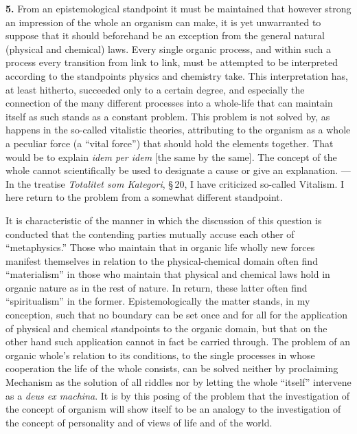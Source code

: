 \documentclass[12pt]{book}
\newcommand{\hnum}[1]{\textbf{#1.}\enspace}
\newcommand{\opage}[1]{\marginnote{\footnotesize\textit{[#1]}}}
\begin{document}
\hnum{5} From an epistemological standpoint it must be maintained that however strong an impression
of the whole an organism can make, it is yet unwarranted to suppose that it should beforehand be an
exception from the general natural (physical and chemical) laws. Every single organic process, and
within such a process every transition from link to link, must be attempted to be interpreted
according to the standpoints physics and chemistry take. This interpretation has, at least
hitherto, succeeded only to a certain degree, and especially the connection of the many different
processes into a whole-life that can maintain itself as such stands as a constant problem. This
problem is not solved by, as happens in the so-called \opage{23}vitalistic theories, attributing to the
organism as a whole a peculiar force (a ``vital force'') that should hold the elements together.
That would be to explain \textit{idem per idem} [the same by the same]. The concept of the whole
cannot scientifically be used to designate a cause or give an explanation. --- In the treatise
\textit{Totalitet som Kategori}, \S\,20, I have criticized so-called Vitalism. I here return to the
problem from a somewhat different standpoint.

It is characteristic of the manner in which the discussion of this question is conducted that the
contending parties mutually accuse each other of ``metaphysics.'' Those who maintain that in organic
life wholly new forces manifest themselves in relation to the physical-chemical domain
often find ``materialism'' in those who maintain that physical and chemical laws hold in organic
nature as in the rest of nature. In return, these latter often find ``spiritualism'' in the former.
Epistemologically the matter stands, in my conception, such that no boundary can be set once and for
all for the application of physical and chemical standpoints to the organic domain, but that on the
other hand such application cannot in fact be carried through. The problem of an organic whole's
relation to its conditions, to the single processes in whose cooperation the life of the whole
consists, can be solved neither by proclaiming Mechanism as the solution of all riddles nor by
letting the whole ``itself'' intervene as a \textit{deus ex machina}. It is by this posing of the
problem that the investigation of the concept of organism will show itself to be an analogy to the
investigation of the concept of personality and of views of life and of the world.
\end{document}
